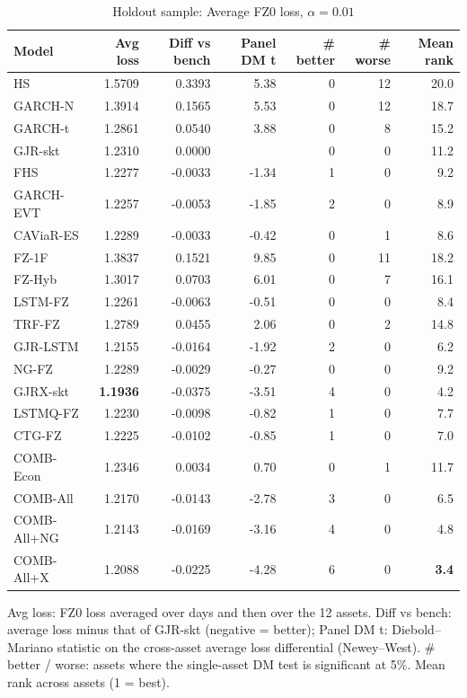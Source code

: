 \begin{table}[htbp]
\centering
\footnotesize
\caption{Holdout sample: Average FZ0 loss, $\alpha=0.01$}
\label{tab:ho_loss_a010}
\begin{tabular}{lrrrrrr}
\toprule
Model & Avg loss & Diff vs bench & Panel DM t & \# better & \# worse & Mean rank \\
\midrule
HS & 1.5709 & 0.3393 & 5.38 & 0 & 12 & 20.0 \\
GARCH-N & 1.3914 & 0.1565 & 5.53 & 0 & 12 & 18.7 \\
GARCH-t & 1.2861 & 0.0540 & 3.88 & 0 & 8 & 15.2 \\
GJR-skt & 1.2310 & 0.0000 &  & 0 & 0 & 11.2 \\
FHS & 1.2277 & -0.0033 & -1.34 & 1 & 0 & 9.2 \\
GARCH-EVT & 1.2257 & -0.0053 & -1.85 & 2 & 0 & 8.9 \\
CAViaR-ES & 1.2289 & -0.0033 & -0.42 & 0 & 1 & 8.6 \\
FZ-1F & 1.3837 & 0.1521 & 9.85 & 0 & 11 & 18.2 \\
FZ-Hyb & 1.3017 & 0.0703 & 6.01 & 0 & 7 & 16.1 \\
LSTM-FZ & 1.2261 & -0.0063 & -0.51 & 0 & 0 & 8.4 \\
TRF-FZ & 1.2789 & 0.0455 & 2.06 & 0 & 2 & 14.8 \\
GJR-LSTM & 1.2155 & -0.0164 & -1.92 & 2 & 0 & 6.2 \\
NG-FZ & 1.2289 & -0.0029 & -0.27 & 0 & 0 & 9.2 \\
GJRX-skt & \textbf{1.1936} & -0.0375 & -3.51 & 4 & 0 & 4.2 \\
LSTMQ-FZ & 1.2230 & -0.0098 & -0.82 & 1 & 0 & 7.7 \\
CTG-FZ & 1.2225 & -0.0102 & -0.85 & 1 & 0 & 7.0 \\
COMB-Econ & 1.2346 & 0.0034 & 0.70 & 0 & 1 & 11.7 \\
COMB-All & 1.2170 & -0.0143 & -2.78 & 3 & 0 & 6.5 \\
COMB-All+NG & 1.2143 & -0.0169 & -3.16 & 4 & 0 & 4.8 \\
COMB-All+X & 1.2088 & -0.0225 & -4.28 & 6 & 0 & \textbf{3.4} \\
\bottomrule
\end{tabular}
\par\smallskip\parbox{\linewidth}{\scriptsize Avg loss: FZ0 loss averaged over days and then over the 12 assets. Diff vs bench: average loss minus that of GJR-skt (negative = better); Panel DM t: Diebold--Mariano statistic on the cross-asset average loss differential (Newey--West). \# better / worse: assets where the single-asset DM test is significant at 5\%. Mean rank across assets (1 = best).}
\end{table}